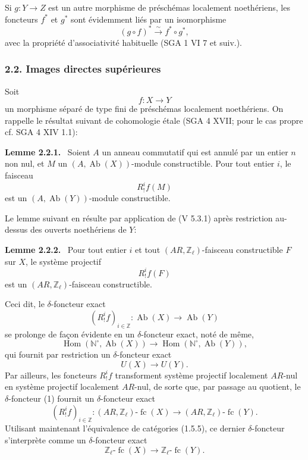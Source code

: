 \documentclass[11pt]{article}
\newenvironment{statement}[1]{\par\medskip\noindent\textbf{#1.}\ }{\par\medskip}
\DeclareMathOperator{\Hom}{Hom}
\providecommand{\Hom}{\operatorname{Hom}}
\providecommand{\Ab}{\operatorname{Ab}}
\providecommand{\fc}{\operatorname{fc}}
\providecommand{\Ab}{\operatorname{Ab}}
\providecommand{\Hom}{\operatorname{Hom}}
\begin{document}
Si \(g:Y\to Z\) est un autre morphisme de préschémas localement noethériens, les foncteurs \(f^*\) et \(g^*\) sont évidemment liés par un isomorphisme
\[
(g\circ f)^*\xrightarrow{\sim}f^*\circ g^*,
\]
avec la propriété d'associativité habituelle (SGA 1 VI 7 et suiv.).

\subsubsection*{2.2. Images directes supérieures}

Soit
\[
f:X\longrightarrow Y
\]
un morphisme séparé de type fini de préschémas localement noethériens. On rappelle le résultat suivant de cohomologie étale (SGA 4 XVII; pour le cas propre cf. SGA 4 XIV 1.1):

\begin{statement}{Lemme 2.2.1}
Soient \(A\) un anneau commutatif qui est annulé par un entier \(n\) non nul, et \(M\) un \((A,\Ab(X))\)-module constructible. Pour tout entier \(i\), le faisceau
\[
R^i_!f(M)
\]
est un \((A,\Ab(Y))\)-module constructible.
\end{statement}

Le lemme suivant en résulte par application de (V 5.3.1) après restriction au-dessus des ouverts noethériens de \(Y\):

\begin{statement}{Lemme 2.2.2}
Pour tout entier \(i\) et tout \((AR,\mathbb Z_\ell)\)-faisceau constructible \(F\) sur \(X\), le système projectif
\[
R^i_!f(F)
\]
est un \((AR,\mathbb Z_\ell)\)-faisceau constructible.
\end{statement}

Ceci dit, le \(\delta\)-foncteur exact
\[
(R^i_!f)_{i\in\mathbb Z}:\Ab(X)\longrightarrow \Ab(Y)
\]
se prolonge de façon évidente en un \(\delta\)-foncteur exact, noté de même,
\[
\Hom(\mathbb N^\circ,\Ab(X))\longrightarrow \Hom(\mathbb N^\circ,\Ab(Y)),
\]
qui fournit par restriction un \(\delta\)-foncteur exact
\[
U(X)\longrightarrow U(Y).
\tag{1}
\]
Par ailleurs, les foncteurs \(R^i_!f\) transforment système projectif localement \(AR\)-nul en système projectif localement \(AR\)-nul, de sorte que, par passage au quotient, le \(\delta\)-foncteur (1) fournit un \(\delta\)-foncteur exact%
\[
(R^i_!f)_{i\in\mathbb Z}:(AR,\mathbb Z_\ell)\text{-}\fc(X)
\longrightarrow (AR,\mathbb Z_\ell)\text{-}\fc(Y).
\]
Utilisant maintenant l'équivalence de catégories (1.5.5), ce dernier \(\delta\)-foncteur s'interprète comme un \(\delta\)-foncteur exact
\[
\mathbb Z_\ell\text{-}\fc(X)\longrightarrow \mathbb Z_\ell\text{-}\fc(Y).
\]
\end{document}
